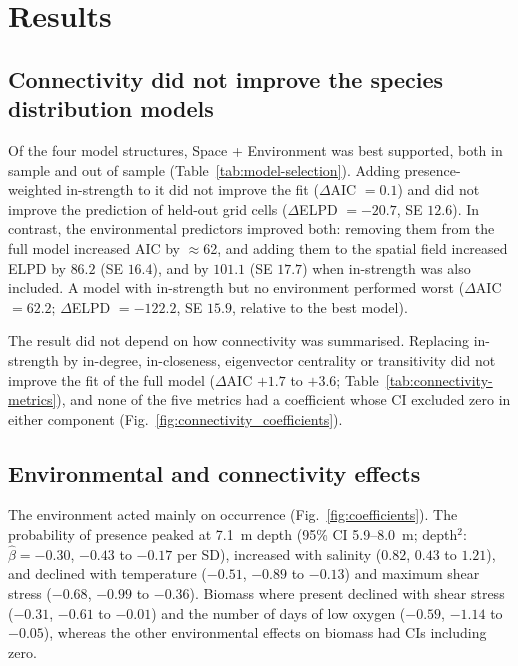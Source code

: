 \section{Results}

\subsection{Connectivity did not improve the species distribution models}

Of the four model structures, Space + Environment was best supported, both in sample and out of sample (Table~\ref{tab:model-selection}). Adding presence-weighted in-strength to it did not improve the fit ($\Delta$AIC $=0.1$) and did not improve the prediction of held-out grid cells ($\Delta$ELPD $=-20.7$, SE $12.6$). In contrast, the environmental predictors improved both: removing them from the full model increased AIC by $\approx$62, and adding them to the spatial field increased ELPD by $86.2$ (SE $16.4$), and by $101.1$ (SE $17.7$) when in-strength was also included. A model with in-strength but no environment performed worst ($\Delta$AIC $=62.2$; $\Delta$ELPD $=-122.2$, SE $15.9$, relative to the best model).

The result did not depend on how connectivity was summarised. Replacing in-strength by in-degree, in-closeness, eigenvector centrality or transitivity did not improve the fit of the full model ($\Delta$AIC $+1.7$ to $+3.6$; Table~\ref{tab:connectivity-metrics}), and none of the five metrics had a coefficient whose CI excluded zero in either component (Fig.~\ref{fig:connectivity_coefficients}).



\subsection{Environmental and connectivity effects}

The environment acted mainly on occurrence (Fig.~\ref{fig:coefficients}). The probability of presence peaked at 7.1~m depth (95\% CI 5.9--8.0~m; depth$^2$: $\hat{\beta}=-0.30$, $-0.43$ to $-0.17$ per SD), increased with salinity ($0.82$, $0.43$ to $1.21$), and declined with temperature ($-0.51$, $-0.89$ to $-0.13$) and maximum shear stress ($-0.68$, $-0.99$ to $-0.36$). Biomass where present declined with shear stress ($-0.31$, $-0.61$ to $-0.01$) and the number of days of low oxygen ($-0.59$, $-1.14$ to $-0.05$), whereas the other environmental effects on biomass had CIs including zero.

